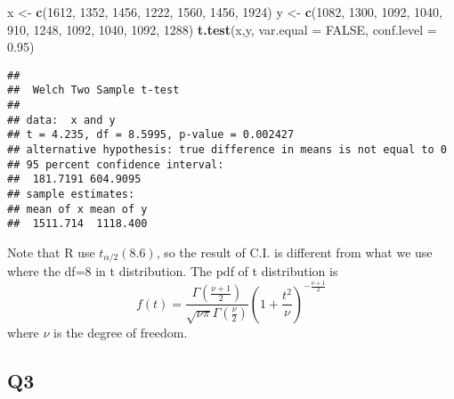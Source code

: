 \documentclass[
]{book}
\newenvironment{Shaded}{\begin{snugshade}}{\end{snugshade}}
\newcommand{\DataTypeTok}[1]{\textcolor[rgb]{0.13,0.29,0.53}{#1}}
\newcommand{\DecValTok}[1]{\textcolor[rgb]{0.00,0.00,0.81}{#1}}
\newcommand{\FloatTok}[1]{\textcolor[rgb]{0.00,0.00,0.81}{#1}}
\newcommand{\KeywordTok}[1]{\textcolor[rgb]{0.13,0.29,0.53}{\textbf{#1}}}
\newcommand{\NormalTok}[1]{#1}
\newcommand{\OtherTok}[1]{\textcolor[rgb]{0.56,0.35,0.01}{#1}}
\newcommand{\StringTok}[1]{\textcolor[rgb]{0.31,0.60,0.02}{#1}}
\theoremstyle{definition}
\theoremstyle{definition}
\theoremstyle{definition}
\theoremstyle{remark}
\begin{document}
\begin{Shaded}
\begin{Highlighting}[]
\NormalTok{x <{-}}\StringTok{ }\KeywordTok{c}\NormalTok{(}\DecValTok{1612}\NormalTok{, }\DecValTok{1352}\NormalTok{, }\DecValTok{1456}\NormalTok{, }\DecValTok{1222}\NormalTok{, }\DecValTok{1560}\NormalTok{, }\DecValTok{1456}\NormalTok{, }\DecValTok{1924}\NormalTok{)}
\NormalTok{y <{-}}\StringTok{ }\KeywordTok{c}\NormalTok{(}\DecValTok{1082}\NormalTok{, }\DecValTok{1300}\NormalTok{, }\DecValTok{1092}\NormalTok{, }\DecValTok{1040}\NormalTok{, }\DecValTok{910}\NormalTok{, }\DecValTok{1248}\NormalTok{, }\DecValTok{1092}\NormalTok{, }\DecValTok{1040}\NormalTok{, }\DecValTok{1092}\NormalTok{, }\DecValTok{1288}\NormalTok{)}
\KeywordTok{t.test}\NormalTok{(x,y, }\DataTypeTok{var.equal =} \OtherTok{FALSE}\NormalTok{, }\DataTypeTok{conf.level =} \FloatTok{0.95}\NormalTok{)}
\end{Highlighting}
\end{Shaded}

\begin{verbatim}
## 
## 	Welch Two Sample t-test
## 
## data:  x and y
## t = 4.235, df = 8.5995, p-value = 0.002427
## alternative hypothesis: true difference in means is not equal to 0
## 95 percent confidence interval:
##  181.7191 604.9095
## sample estimates:
## mean of x mean of y 
##  1511.714  1118.400
\end{verbatim}

Note that R use \(t_{\alpha/2}(8.6)\), so the result of C.I. is different from what we use where the df=8 in t distribution. The pdf of t distribution is
\begin{equation}
f(t)=\frac{\Gamma\left(\frac{\nu+1}{2}\right)}{\sqrt{\nu \pi} \Gamma\left(\frac{\nu}{2}\right)}\left(1+\frac{t^{2}}{\nu}\right)^{-\frac{\nu+1}{2}}
\end{equation}
where \(\nu\) is the degree of freedom.

\hypertarget{q3-1}{%
\subsection{Q3}\label{q3-1}}
\end{document}
